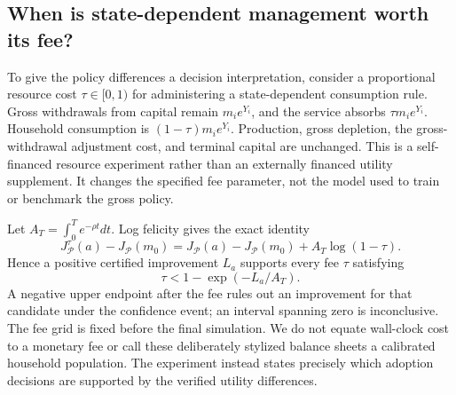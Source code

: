 \subsection{When is state-dependent management worth its fee?}\label{sec:r12fees}
To give the policy differences a decision interpretation, consider a proportional resource cost $\tau\in[0,1)$ for administering a state-dependent consumption rule. Gross withdrawals from capital remain $m_i e^{Y_i}$, and the service absorbs $\tau m_i e^{Y_i}$. Household consumption is $(1-\tau)m_i e^{Y_i}$. Production, gross depletion, the gross-withdrawal adjustment cost, and terminal capital are unchanged. This is a self-financed resource experiment rather than an externally financed utility supplement. It changes the specified fee parameter, not the model used to train or benchmark the gross policy.

Let $A_T=\int_0^T e^{-\rho t}dt$. Log felicity gives the exact identity
\begin{equation}\label{eq:r12fee}
 J_{\mathcal P}^{\tau}(a)-J_{\mathcal P}(m_0)
 =J_{\mathcal P}(a)-J_{\mathcal P}(m_0)+A_T\log(1-\tau).
\end{equation}
Hence a positive certified improvement $L_a$ supports every fee $\tau$ satisfying
\[
 \tau<1-\exp(-L_a/A_T).
\]
 A negative upper endpoint after the fee rules out an improvement for that candidate under the confidence event; an interval spanning zero is inconclusive. The fee grid is fixed before the final simulation. We do not equate wall-clock cost to a monetary fee or call these deliberately stylized balance sheets a calibrated household population. The experiment instead states precisely which adoption decisions are supported by the verified utility differences.
